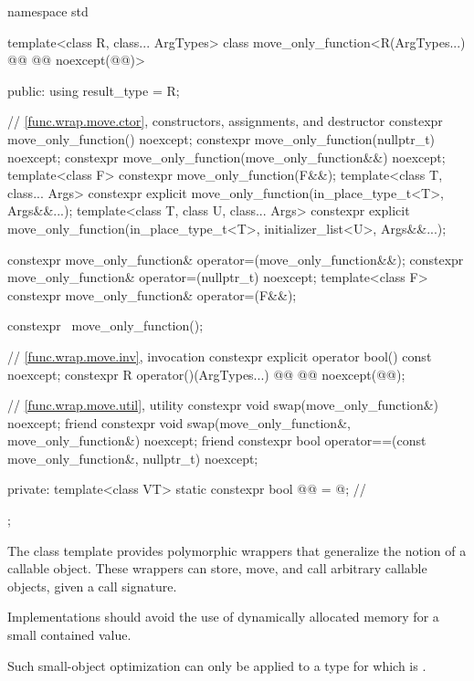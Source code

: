\begin{codeblock}
namespace std {
  template<class R, class... ArgTypes>
  class move_only_function<R(ArgTypes...) @\cv{}@ @@ noexcept(@@)> {
  public:
    using result_type = R;

    // \ref{func.wrap.move.ctor}, constructors, assignments, and destructor
    constexpr move_only_function() noexcept;
    constexpr move_only_function(nullptr_t) noexcept;
    constexpr move_only_function(move_only_function&&) noexcept;
    template<class F> constexpr move_only_function(F&&);
    template<class T, class... Args>
      constexpr explicit move_only_function(in_place_type_t<T>, Args&&...);
    template<class T, class U, class... Args>
      constexpr explicit move_only_function(in_place_type_t<T>, initializer_list<U>, Args&&...);

    constexpr move_only_function& operator=(move_only_function&&);
    constexpr move_only_function& operator=(nullptr_t) noexcept;
    template<class F> constexpr move_only_function& operator=(F&&);

    constexpr ~move_only_function();

    // \ref{func.wrap.move.inv}, invocation
    constexpr explicit operator bool() const noexcept;
    constexpr R operator()(ArgTypes...) @\cv{}@ @@ noexcept(@@);

    // \ref{func.wrap.move.util}, utility
    constexpr void swap(move_only_function&) noexcept;
    friend constexpr void swap(move_only_function&, move_only_function&) noexcept;
    friend constexpr bool operator==(const move_only_function&, nullptr_t) noexcept;

  private:
    template<class VT>
      static constexpr bool @@ = @\seebelow@;       // \expos
  };
}
\end{codeblock}

\pnum
The  class template provides polymorphic wrappers that generalize the notion of a callable object. These wrappers can store, move, and call arbitrary callable objects, given a call signature.

\pnum
\recommended
Implementations should avoid the use of dynamically allocated memory for a small contained value.
\begin{note}
Such small-object optimization can only be applied to a type  for which  is .
\end{note}

